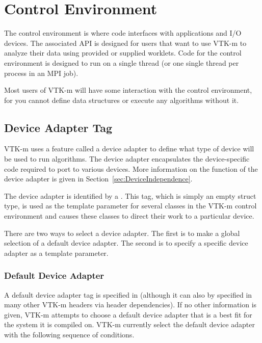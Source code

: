 
\chapter{Control Environment}
\label{chap:ControlEnvironment}


The control environment is where code interfaces with applications and I/O
devices. The associated API is designed for users that want to use VTK-m to
analyze their data using provided or supplied worklets. Code for the
control environment is designed to run on a single thread (or one single
thread per process in an MPI job).

Most users of VTK-m will have some interaction with the control
environment, for you cannot define data structures or execute any
algorithms without it.

\section{Device Adapter Tag}
\label{sec:DeviceAdapterTag}


VTK-m uses a feature called a device adapter to define what type of device
will be used to run algorithms. The device adapter encapsulates the
device-specific code required to port to various devices. More information
on the function of the device adapter is given in
Section~\ref{sec:DeviceIndependence}.

The device adapter is identified by a .
  This tag, which is
simply an empty struct type, is used as the template parameter for several
classes in the VTK-m control environment and causes these classes to direct
their work to a particular device.

There are two ways to select a device adapter. The first is to make a
global selection of a default device adapter. The second is to specify a
specific device adapter as a template parameter.

\subsection{Default Device Adapter}

A default device adapter tag is specified in
 (although it can also by specified
in many other VTK-m headers via header dependencies). If no other
information is given, VTK-m attempts to choose a default device adapter
that is a best fit for the system it is compiled on. VTK-m currently select
the default device adapter with the following sequence of conditions.

